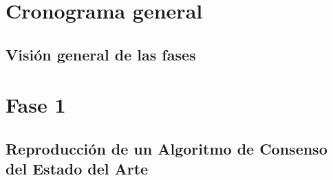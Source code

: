 \section{Cronograma general}
\subsection{Visión general de las fases}
\section{Fase 1}
\subsection{Reproducción de un Algoritmo de Consenso del Estado del Arte}
